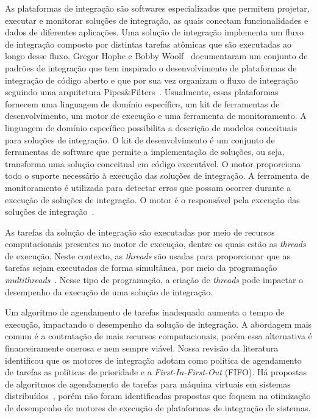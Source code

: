 As plataformas de integração são softwares especializados que permitem projetar, executar e monitorar soluções de integração, as quais conectam funcionalidades e dados de diferentes aplicações. Uma solução de integração implementa um fluxo de integração composto por distintas tarefas atômicas que são executadas ao longo desse fluxo. Gregor Hophe e Bobby Woolf~\cite{hohpe2004} documentaram um conjunto de padrões de integração que tem inspirado o desenvolvimento de plataformas de integração de código aberto e que por sua vez organizam o fluxo de integração seguindo uma arquitetura Pipes\&Filters~\cite{alexander1977}. 
 Usualmente, essas plataformas fornecem uma linguagem de domínio específico, um kit de ferramentas de desenvolvimento, um motor de execução e uma ferramenta de monitoramento. A linguagem de domínio específico possibilita a descrição de modelos conceituais para soluções de integração. O kit de desenvolvimento é um conjunto de ferramentas de software que permite a implementação de soluções, ou seja, transforma uma solução conceitual em código executável. O motor proporciona todo o suporte necessário à execução das soluções de integração. A ferramenta de monitoramento é utilizada para detectar erros que possam ocorrer durante a execução de soluções de integração. O motor é o responsável pela execução das soluções de integração~\cite{frantz2016}. 

As tarefas da solução de integração são executadas por meio de recursos computacionais presentes no motor de execução, dentre os quais estão as \emph{threads} de execução. Neste contexto, as \emph{threads} s\~{a}o usadas para proporcionar que as tarefas sejam executadas de forma simultânea, por meio da programação \emph{multithreads}~\cite{dietel2009,tanebaum2009}. Nesse tipo de programação, a criação de \emph{threads} pode impactar o desempenho da execução de uma solução de integração.

Um algoritmo de agendamento de tarefas inadequado aumenta o tempo de execução, impactando o desempenho da solução de integração. A abordagem mais comum é a contratação de mais recursos computacionais, porém essa alternativa é financeiramente onerosa e nem sempre viável. Nossa revisão da literatura identificou que os motores de integração adotam como política de agendamento de tarefas as políticas de prioridade e a \textit{First-In-First-Out} (FIFO). Há propostas de algoritmos de agendamento de tarefas para máquina virtuais em sistemas distribuídos~\cite{rodriguez2014,al2015}, porém não foram identificadas propostas que foquem na otimização de desempenho de motores de execução de plataformas de integração de sistemas. 

